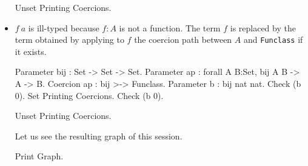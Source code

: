 \begin{itemize}
\begin{coq_eval}
Unset Printing Coercions.
\end{coq_eval}

\item $f~a$ is ill-typed because $f:A$ is not a function. The term
      $f$ is replaced by the term obtained by applying to $f$ the
      coercion path between $A$ and {\tt Funclass} if it exists.

\begin{coq_example}
Parameter bij : Set -> Set -> Set.
Parameter ap : forall A B:Set, bij A B -> A -> B.
Coercion ap : bij >-> Funclass.
Parameter b : bij nat nat.
Check (b 0).
Set Printing Coercions.
Check (b 0).
\end{coq_example}

\begin{coq_eval}
Unset Printing Coercions.
\end{coq_eval}

Let us see the resulting graph of this session.

\begin{coq_example}
Print Graph.
\end{coq_example}

\end{itemize}


